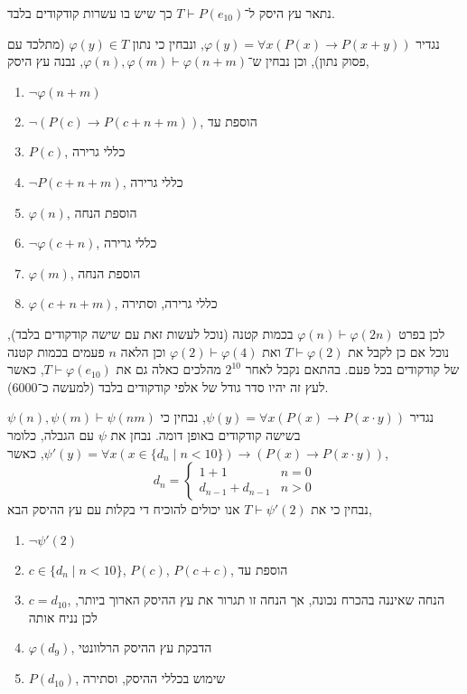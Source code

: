\subquestion{}
נתאר עץ היסק ל־$T \vdash P(e_{10})$ כך שיש בו עשרות קודקודים בלבד.
\begin{solution}
	נגדיר $\varphi(y) = \forall x (P(x) \rightarrow P(x + y))$, ונבחין כי נתון $\varphi(y) \in T$ (מתלכד עם פסוק נתון), וכן נבחין ש־$\varphi(n), \varphi(m) \vdash \varphi(n + m)$, נבנה עץ היסק,
	\begin{enumerate}
		\item $\lnot \varphi(n + m)$
		\item $\lnot (P(c) \to P(c + n + m))$, הוספת עד
		\item $P(c)$, כללי גרירה
		\item $\lnot P(c + n + m)$, כללי גרירה
		\item $\varphi(n)$, הוספת הנחה
		\item $\lnot \varphi(c + n)$, כללי גרירה
		\item $\varphi(m)$, הוספת הנחה
		\item $\varphi(c + n + m)$, כללי גרירה, וסתירה
	\end{enumerate}
	לכן בפרט $\varphi(n) \vdash \varphi(2n)$ בכמות קטנה (נוכל לעשות זאת עם שישה קודקודים בלבד), נוכל אם כן לקבל את $T \vdash \varphi(2)$ ואת $\varphi(2) \vdash \varphi(4)$ וכן הלאה $n$ פעמים בכמות קטנה של קודקודים בכל פעם.
	בהתאם נקבל לאחר $2^{10}$ מהלכים כאלה גם את $T \vdash \varphi(e_{10})$, כאשר לעץ זה יהיו סדר גודל של אלפי קודקודים בלבד (למעשה כ־6000).

	נגדיר $\psi(y) = \forall x (P(x) \rightarrow P(x \cdot y))$, נבחין כי $\psi(n), \psi(m) \vdash \psi(nm)$ בשישה קודקודים באופן דומה.
	נבחן את $\psi$ עם הגבלה, כלומר $\psi'(y) = \forall x (x \in \{ d_n \mid n < 10 \}) \rightarrow (P(x) \rightarrow P(x \cdot y))$, כאשר,
	\[
		d_n
		= \begin{cases}
			1 + 1 & n = 0 \\
			d_{n - 1} + d_{n - 1} & n > 0
		\end{cases}
	\]
	נבחין כי את $T \vdash \psi'(2)$ אנו יכולים להוכיח די בקלות עם עץ ההיסק הבא,
	\begin{enumerate}
		\item $\lnot \psi'(2)$
		\item $c \in \{ d_n \mid n < 10 \}$, $P(c)$, $P(c + c)$, הוספת עד
		\item $c = d_{10}$, הנחה שאיננה בהכרח נכונה, אך הנחה זו תגרור את עץ ההיסק הארוך ביותר, לכן נניח אותה
		\item $\varphi(d_{9})$, הדבקת עץ ההיסק הרלוונטי
		\item $P(d_{10})$, שימוש בכללי ההיסק, וסתירה
	\end{enumerate}
\end{solution}


